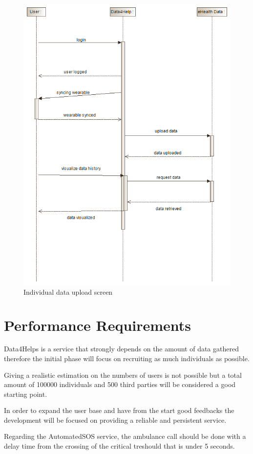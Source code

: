 \begin{figure}[H]
  \includegraphics[width=0.79\linewidth]{resources/UML/IndividualInteraction.png}
  \caption{Individual data upload screen}
  \label{fig:Individual sequence diagram}
\end{figure}





\section{Performance Requirements}
Data4Helps is a service that strongly depends on the amount of data gathered therefore the initial phase will focus on recruiting as much individuals as possible.

Giving a realistic estimation on the numbers of users is not possible but a total amount of 100000 individuals and 500 third parties will be considered a good starting point.

In order to expand the user base and have from the start good feedbacks the development will be focused on providing a reliable and persistent service. 

Regarding the AutomatedSOS service, the ambulance call should be done with a delay time from the crossing of the critical treshould that is under 5 seconds.

